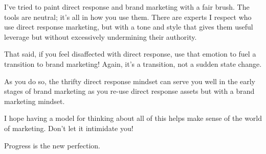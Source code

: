 \documentclass[13pt,]{tufte-handout}
\begin{document}
I've tried to paint direct response and brand marketing with a fair
brush. The tools are neutral; it's all in how you use them. There are
experts I respect who use direct response marketing, but with a tone and
style that gives them useful leverage but without excessively
undermining their authority.

That said, if you feel disaffected with direct response, use that
emotion to fuel a transition to brand marketing! Again, it's a
transition, not a sudden state change.

As you do so, the thrifty direct response mindset can serve you well in
the early stages of brand marketing as you re-use direct response assets
but with a brand marketing mindset.

I hope having a model for thinking about all of this helps make sense of
the world of marketing. Don't let it intimidate you!

Progress is the new perfection.
\end{document}
